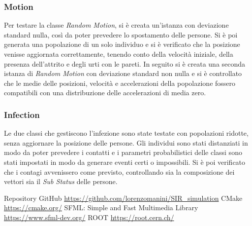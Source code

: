 \documentclass[a4paper,10pt,twocolumn]{article}
\begin{document}
\subsubsection*{Motion}
Per testare la classe \emph{Random Motion}, si è creata un'istanza con deviazione standard nulla, così da poter prevedere lo spostamento delle persone. Si è poi generata una popolazione di un solo individuo e si è verificato che la posizione venisse aggiornata correttamente, tenendo conto della velocità iniziale, della presenza dell'attrito e degli urti con le pareti. In seguito si è creata una seconda istanza di \emph{Random Motion} con deviazione standard non nulla e si è controllato che le medie delle posizioni, velocità e accelerazioni della popolazione fossero compatibili con una distribuzione delle accelerazioni di media zero.

\subsubsection*{Infection}
Le due classi che gestiscono l'infezione sono state testate con popolazioni ridotte, senza aggiornare la posizione delle persone. Gli individui sono stati distanziati in modo da poter prevedere i contatti e i parametri probabilistici delle classi sono stati impostati in modo da generare eventi certi o impossibili. Si è poi verificato che i contagi avvenissero come previsto, controllando sia la composizione dei vettori sia il \emph{Sub Status} delle persone.

\begin{thebibliography}{9}
     Repository GitHub \url{https://github.com/lorenzomanini/SIR\_simulation}
     CMake \url{https://cmake.org/}
     SFML: Simple and Fast Multimedia Library \url{https://www.sfml-dev.org/}
     ROOT \url{https://root.cern.ch/}
\end{thebibliography}
\end{document}
